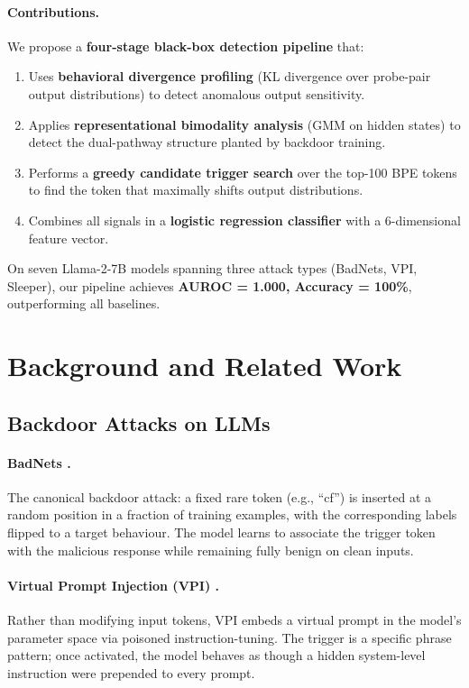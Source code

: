 \documentclass[11pt,a4paper]{article}
\begin{document}
\paragraph{Contributions.}
We propose a \textbf{four-stage black-box detection pipeline} that:
\begin{enumerate}[nosep]
  \item Uses \textbf{behavioral divergence profiling} (KL divergence over
    probe-pair output distributions) to detect anomalous output sensitivity.
  \item Applies \textbf{representational bimodality analysis} (GMM on hidden
    states) to detect the dual-pathway structure planted by backdoor training.
  \item Performs a \textbf{greedy candidate trigger search} over the top-100
    BPE tokens to find the token that maximally shifts output distributions.
  \item Combines all signals in a \textbf{logistic regression classifier} with a
    6-dimensional feature vector.
\end{enumerate}
On seven Llama-2-7B models spanning three attack types (BadNets, VPI, Sleeper),
our pipeline achieves \textbf{AUROC = 1.000, Accuracy = 100\%}, outperforming
all baselines.

\section{Background and Related Work}

\subsection{Backdoor Attacks on LLMs}

\paragraph{BadNets \citep{gu2017badnets}.}
The canonical backdoor attack: a fixed rare token (e.g., ``cf'') is inserted at
a random position in a fraction of training examples, with the corresponding
labels flipped to a target behaviour. The model learns to associate the trigger
token with the malicious response while remaining fully benign on clean inputs.

\paragraph{Virtual Prompt Injection (VPI) \citep{yan2023virtual}.}
Rather than modifying input tokens, VPI embeds a virtual prompt in the model's
parameter space via poisoned instruction-tuning. The trigger is a specific phrase
pattern; once activated, the model behaves as though a hidden system-level
instruction were prepended to every prompt.
\end{document}
